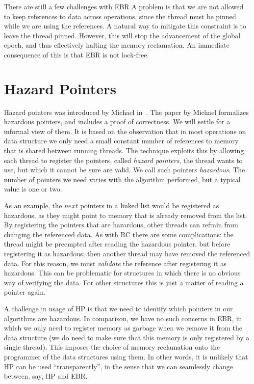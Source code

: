 \documentclass[b5paper]{report}
\begin{document}

There are still a few challenges with EBR A problem is that we are not
allowed to keep references to data across operations, since the thread must be
pinned while we are using the references. A natural way to mitigate this
constraint is to leave the thread pinned. However, this will stop the
advancement of the global epoch, and thus effectively halting the memory
reclamation. An immediate consequence of this is that EBR is not lock-free.



\section{Hazard Pointers}

Hazard pointers was introduced by Michael in~\cite{michael2004hazard}.
The paper by Michael formalizes hazardous pointers, and includes a proof of
correctness. We will settle for a informal view of them. It is
based on the observation that in most operations on data structure we only need
a small constant number of references to memory that is shared between running
threads. The technique exploits this by allowing each thread to register the
pointers, called \emph{hazard pointers}, the thread wants to use, but which it
cannot be sure are valid. We call such pointers \emph{hazardous}. The number of
pointers we need varies with the algorithm performed, but a typical value is one
or two.

As an example, the $next$ pointers in a linked list would be registered as
hazardous, as they might point to memory that is already removed from the list.
By registering the pointers that are hazardous, other threads can refrain from
changing the referenced data. As with RC there are some complications: the
thread might be preempted after reading the hazardous pointer, but before
registering it as hazardous; then another thread may have removed the referenced
data. For this reason, we must \emph{validate} the reference after registering
it as hazardous. This can be problematic for structures in which there is no
obvious way of verifying the data. For other structures this is just a matter of
reading a pointer again.

A challenge in usage of HP is that we need to identify which pointers in our
algorithms are hazardous. In comparison, we have no such concerns in EBR, in
which we only need to register memory as garbage when we remove it from the data
structure (we do need to make sure that this memory is only registered by a
single thread). This imposes the choice of memory reclamation onto the
programmer of the data structures using them. In other words, it is unlikely
that HP can be used ``transparently'', in the sense that we can seamlessly
change between, say, HP and EBR\@.
\end{document}
